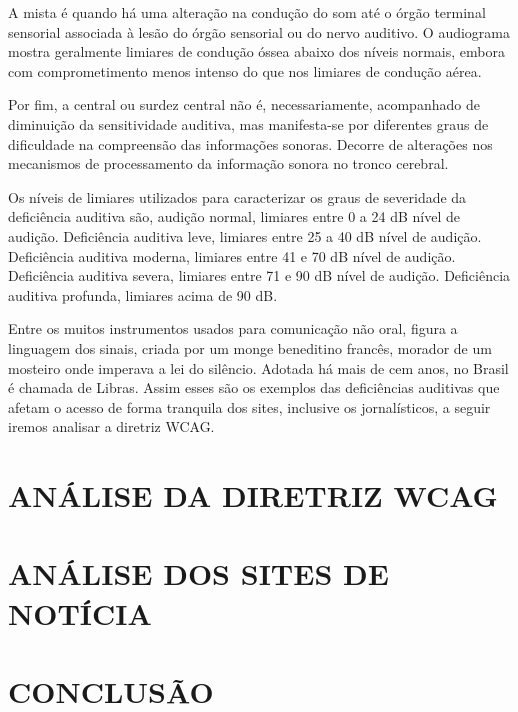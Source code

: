 \documentclass[a4paper]{article}
\begin{document}
\begin{titlepage}
A mista é quando há uma alteração na condução do som até o órgão terminal sensorial associada à lesão do órgão sensorial ou do nervo auditivo. O audiograma mostra geralmente limiares de condução óssea abaixo dos níveis normais, embora com comprometimento menos intenso do que nos limiares de condução aérea.

Por fim, a central ou surdez central não é, necessariamente, acompanhado de diminuição da sensitividade auditiva, mas manifesta-se por diferentes graus de dificuldade na compreensão das informações sonoras. Decorre de alterações nos mecanismos de processamento da informação sonora no tronco cerebral.

Os níveis de limiares utilizados para caracterizar os graus de severidade da deficiência auditiva são, audição normal, limiares entre 0 a 24 dB nível de audição. Deficiência auditiva leve, limiares entre 25 a 40 dB nível de audição. Deficiência auditiva moderna, limiares entre 41 e 70 dB nível de audição. Deficiência auditiva severa, limiares entre 71 e 90 dB nível de audição. Deficiência auditiva profunda, limiares acima de 90 dB.

Entre os muitos instrumentos usados para comunicação não oral, figura a linguagem dos sinais, criada por um monge beneditino francês, morador de um mosteiro onde imperava a lei do silêncio. Adotada há mais de cem anos, no Brasil é chamada de Libras. Assim esses são os exemplos das deficiências auditivas que afetam o acesso de forma tranquila dos sites, inclusive os jornalísticos, a seguir iremos analisar a diretriz WCAG.

\section{ANÁLISE DA DIRETRIZ WCAG}

\section{ANÁLISE DOS SITES DE NOTÍCIA}

\section{CONCLUSÃO}


\end{titlepage}
\end{document}
